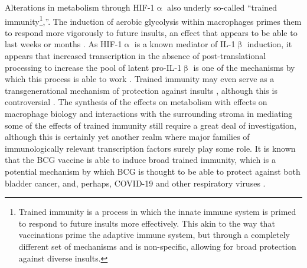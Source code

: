 Alterations in metabolism through HIF\hyp{}1$\upalpha$ also underly so\hyp{}called ``trained immunity\footnote{Trained immunity is a process in which the innate immune system is primed to respond to future insults more effectively. This akin to the way that vaccinations prime the adaptive immune system, but through a completely different set of mechanisms and is non\hyp{}specific, allowing for broad protection against diverse insults.},''. The induction of aerobic glycolysis within macrophages primes them to respond more vigorously to future insults, an effect that appears to be able to last weeks or months \citep{Cheng2014}. As HIF\hyp{}1$\upalpha$ is a known mediator of IL\hyp{}1$\upbeta$ induction, it appears that increased transcription in the absence of post\hyp{}translational processing to increase the pool of latent pro\hyp{}IL\hyp{}1$\upbeta$ is one of the mechanisms by which this process is able to work \citep{Arts2018}. Trained immunity may even serve as a transgenerational mechanism of protection against insults \citep{Katzmarski2021}, although this is controversial \citep{Kaufmann2022, Katzmarski2022}. The synthesis of the effects on metabolism with effects on macrophage biology and interactions with the surrounding stroma in mediating some of the effects of trained immunity still require a great deal of investigation, although this is certainly yet another realm where major families of immunologically relevant transcription factors surely play some role. It is known that the BCG vaccine is able to induce broad trained immunity, which is a potential mechanism by which BCG is thought to be able to protect against both bladder cancer, and, perhaps, COVID\hyp{}19 and other respiratory viruses \citep{Arts2016, Arts2018, Covian2019, vanPuffelen2020, ONeill2020}.


